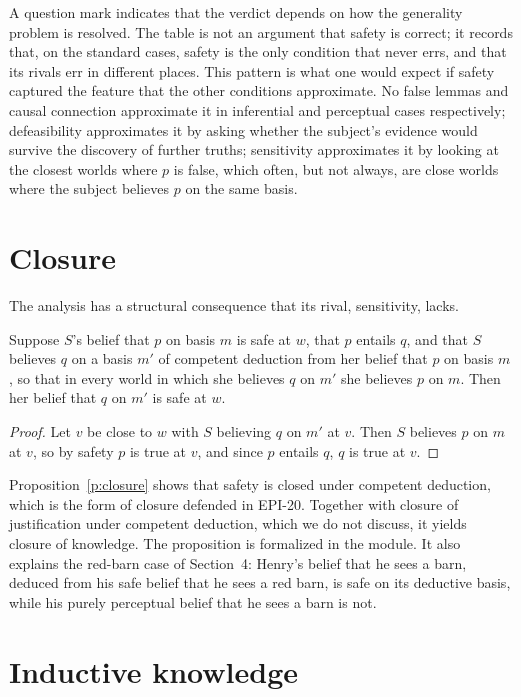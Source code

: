 \documentclass{situationist-preprint}
\begin{document}
A question mark indicates that the verdict depends on how the generality problem is resolved. The table is not an argument that safety is correct; it records that, on the standard cases, safety is the only condition that never errs, and that its rivals err in different places. This pattern is what one would expect if safety captured the feature that the other conditions approximate. No false lemmas and causal connection approximate it in inferential and perceptual cases respectively; defeasibility approximates it by asking whether the subject's evidence would survive the discovery of further truths; sensitivity approximates it by looking at the closest worlds where $p$ is false, which often, but not always, are close worlds where the subject believes $p$ on the same basis.

\section{Closure}

The analysis has a structural consequence that its rival, sensitivity, lacks.

\begin{proposition}\label{p:closure}
Suppose $S$'s belief that $p$ on basis $m$ is safe at $w$, that $p$ entails $q$, and that $S$ believes $q$ on a basis $m'$ of competent deduction from her belief that $p$ on basis $m$, so that in every world in which she believes $q$ on $m'$ she believes $p$ on $m$. Then her belief that $q$ on $m'$ is safe at $w$.
\end{proposition}

\begin{proof}
Let $v$ be close to $w$ with $S$ believing $q$ on $m'$ at $v$. Then $S$ believes $p$ on $m$ at $v$, so by safety $p$ is true at $v$, and since $p$ entails $q$, $q$ is true at $v$.
\end{proof}

Proposition~\ref{p:closure} shows that safety is closed under competent deduction, which is the form of closure defended in EPI-20. Together with closure of justification under competent deduction, which we do not discuss, it yields closure of knowledge. The proposition is formalized in the module. It also explains the red-barn case of Section~4: Henry's belief that he sees a barn, deduced from his safe belief that he sees a red barn, is safe on its deductive basis, while his purely perceptual belief that he sees a barn is not.

\section{Inductive knowledge}
\end{document}
